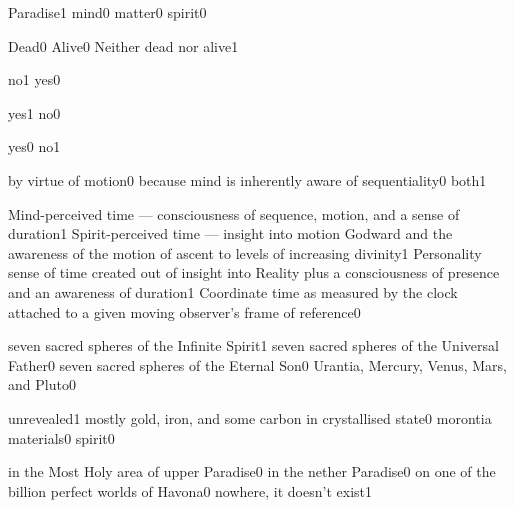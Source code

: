 

{Paradise}{1}
{mind}{0}
{matter}{0}
{spirit}{0}
\qstop

{Dead}{0}
{Alive}{0}
{Neither dead nor alive}{1}
\qstop

{no}{1}
{yes}{0}
\qstop

{yes}{1}
{no}{0}
\qstop

{yes}{0}
{no}{1}
\qstop


{by virtue of motion}{0}
{because mind is inherently aware of sequentiality}{0}
{both}{1}
\qstop

{Mind-perceived time --- consciousness of sequence, motion, and a sense of duration}{1}
{Spirit-perceived time --- insight into motion Godward and the awareness of the motion of ascent to levels of increasing divinity}{1}
{Personality sense of time created out of insight into Reality plus a consciousness of presence and an awareness of duration}{1}
{Coordinate time as measured by the clock attached to a given moving observer's frame of reference}{0}
\qstop


{seven sacred spheres of the Infinite Spirit}{1}
{seven sacred spheres of the Universal Father}{0}
{seven sacred spheres of the Eternal Son}{0}
{Urantia, Mercury, Venus, Mars, and Pluto}{0}
\qstop

{unrevealed}{1}
{mostly gold, iron, and some carbon in crystallised state}{0}
{morontia materials}{0}
{spirit}{0}
\qstop

{in the Most Holy area of upper Paradise}{0}
{in the nether Paradise}{0}
{on one of the billion perfect worlds of Havona}{0}
{nowhere, it doesn't exist}{1}
\qstop

